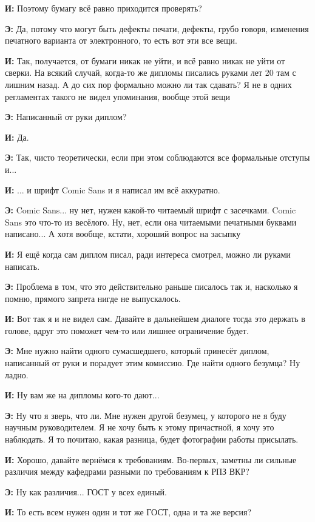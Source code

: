 \textbf{И: }Поэтому бумагу всё равно приходится проверять?

\textbf{Э: }Да, потому что могут быть дефекты печати, дефекты, грубо говоря, изменения печатного варианта от электронного, то есть вот эти все вещи.

\textbf{И: }Так, получается, от бумаги никак не уйти, и всё равно никак не уйти от сверки. На всякий случай, когда-то же дипломы писались руками лет 20 там с лишним назад. А до сих пор формально можно ли так сдавать? Я не в одних регламентах такого не видел упоминания, вообще этой вещи

\textbf{Э: }Написанный от руки диплом?

\textbf{И: }Да.

\textbf{Э: }Так, чисто теоретически, если при этом соблюдаются все формальные отступы и...

\textbf{И: }... и шрифт Comic Sans и я написал им всё аккуратно.

\textbf{Э: }Comic Sans... ну нет, нужен какой-то читаемый шрифт с засечками. Comic Sans это что-то из весёлого. Ну, нет, если она читаемыми печатными буквами написано... А хотя вообще, кстати, хороший вопрос на засыпку

\textbf{И: }Я ещё когда сам диплом писал, ради интереса смотрел, можно ли руками написать. 

\textbf{Э: }Проблема в том, что это действительно раньше писалось так и, насколько я помню, прямого запрета нигде не выпускалось. 

\textbf{И: }Вот так я и не видел сам. Давайте в дальнейшем диалоге тогда это держать в голове, вдруг это поможет чем-то или лишнее ограничение будет.

\textbf{Э: }Мне нужно найти одного сумасшедшего, который принесёт диплом, написанный от руки и порадует этим комиссию. Где найти одного безумца? Ну ладно.

\textbf{И: }Ну вам же на дипломы кого-то дают...

\textbf{Э: }Ну что я зверь, что ли. Мне нужен другой безумец, у которого не я буду научным руководителем. Я не хочу быть к этому причастной, я хочу это наблюдать. Я то почитаю, какая разница, будет фотографии работы присылать.

\textbf{И: }Хорошо, давайте вернёмся к требованиям. Во-первых, заметны ли сильные различия между кафедрами разными по требованиям к РПЗ ВКР?

\textbf{Э: }Ну как различия... ГОСТ у всех единый.

\textbf{И: }То есть всем нужен один и тот же ГОСТ, одна и та же версия?

